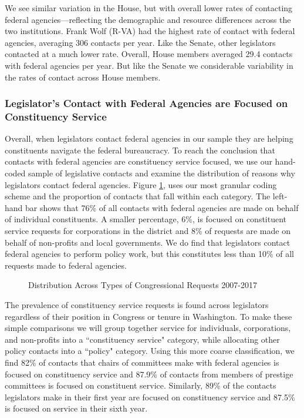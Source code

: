 \documentclass[12pt]{article}
\begin{document}
We see similar variation in the House, but with overall lower rates of contacting federal agencies---reflecting the demographic and resource differences across the two institutions. Frank Wolf (R-VA) had the highest rate of contact with federal agencies, averaging 306 contacts per year. Like the Senate, other legislators contacted at a much lower rate. Overall, House members averaged 29.4 contacts with federal agencies per year. But like the Senate we considerable variability in the rates of contact across House members.  

\subsubsection{Legislator's Contact with Federal Agencies are Focused on Constituency Service}
Overall, when legislators contact federal agencies in our sample they are helping constituents navigate the federal bureaucracy. To reach the conclusion that contacts with federal agencies are constituency service focused, we use our hand-coded sample of legislative contacts and examine the distribution of reasons why legislators contact federal agencies. Figure \ref{f:type2}, uses our most granular coding scheme and the proportion of contacts that fall within each category. The left-hand bar shows that 76\% of all contacts with federal agencies are made on behalf of individual constituents. A smaller percentage, 6\%, is focused on constituent service requests for corporations in the district and 8\% of requests are made on behalf of non-profits and local governments. We do find that legislators contact federal agencies to perform policy work, but this constitutes less than 10\% of all requests made to federal agencies.  


\begin{figure}[hbt!]
\centering
\caption{Distribution Across Types of Congressional Requests 2007-2017} \label{f:type2}
\end{figure}

The prevalence of constituency service requests is found across legislators regardless of their position in Congress or tenure in Washington. To make these simple comparisons we will group together service for individuals, corporations, and non-profits into a ``constituency service" category, while allocating other policy contacts into a ``policy" category. Using this more coarse classification, we find 82\% of contacts that chairs of committees make with federal agencies is focused on constituency service and 87.9\% of contacts from members of prestige committees is focused on constituent service. Similarly, 89\% of the contacts legislators make in their first year are focused on constituency service and 87.5\% is focused on service in their sixth year. 
\end{document}

